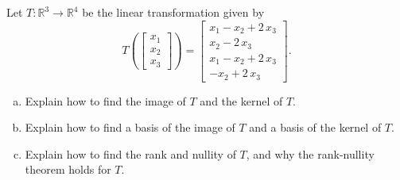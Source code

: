 
\begin{exerciseStatement}
 Let \(T:\mathbb{R}^ 3  \to \mathbb{R}^ 4 \) be the linear transformation given by \[T\left(  \left[\begin{array}{c}
x_{1} \\
x_{2} \\
x_{3}
\end{array}\right]  \right) =  \left[\begin{array}{c}
x_{1} - x_{2} + 2 \, x_{3} \\
x_{2} - 2 \, x_{3} \\
x_{1} - x_{2} + 2 \, x_{3} \\
-x_{2} + 2 \, x_{3}
\end{array}\right] .\]
\begin{enumerate}[(a)]
\item Explain how to find the image of \(T\) and the kernel of \(T\).
\item Explain how to find a basis of the image of \(T\) and a basis of the kernel of \(T\).
\item Explain how to find the rank and nullity of \(T\), and why the rank-nullity theorem holds for \(T\).
\end{enumerate}
    
\end{exerciseStatement}
    
